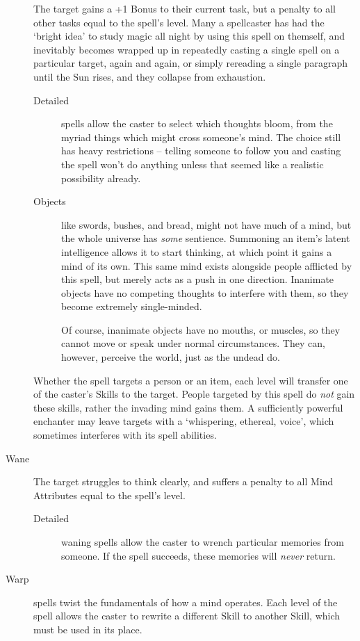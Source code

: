 \begin{multicols}{2}
\begin{description}
    The target gains a +1 Bonus to their current task, but a penalty to all other tasks equal to the spell's level.
    Many a spellcaster has had the `bright idea' to study magic all night by using this spell on themself, and inevitably becomes wrapped up in repeatedly casting a single spell on a particular target, again and again, or simply rereading a single paragraph until the Sun rises, and they collapse from exhaustion.
    \begin{description}
      \item[Detailed]
        spells allow the caster to select which thoughts bloom, from the myriad things which might cross someone's mind.
        The choice still has heavy restrictions -- telling someone to follow you and casting the spell won't do anything unless that seemed like a realistic possibility already.
      \item[Objects]
        like swords, bushes, and bread, might not have much of a mind, but the whole universe has \emph{some} sentience.
        Summoning an item's latent intelligence allows it to start thinking, at which point it gains a mind of its own.
        This same mind exists alongside people afflicted by this spell, but merely acts as a push in one direction.
        Inanimate objects have no competing thoughts to interfere with them, so they become extremely single-minded.

        Of course, inanimate objects have no mouths, or muscles, so they cannot move or speak under normal circumstances.
        They can, however, perceive the world, just as the undead do.%
    \end{description}

    Whether the spell targets a person or an item, each level will transfer one of the caster's Skills to the target.
    People targeted by this spell do \emph{not} gain these skills, rather the invading mind gains them.
    A sufficiently powerful enchanter may leave targets with a `whispering, ethereal, voice', which sometimes interferes with its spell abilities.
  \item[Wane]
    The target struggles to think clearly, and suffers a penalty to all Mind Attributes equal to the spell's level.
    \begin{description}
      \item[Detailed]
        waning spells allow the caster to wrench particular memories from someone.
        If the spell succeeds, these memories will \emph{never} return.
    \end{description}
  \item[Warp]
    spells twist the fundamentals of how a mind operates.
    Each level of the spell allows the caster to rewrite a different Skill to another Skill, which must be used in its place.


\end{description}
\end{multicols}
